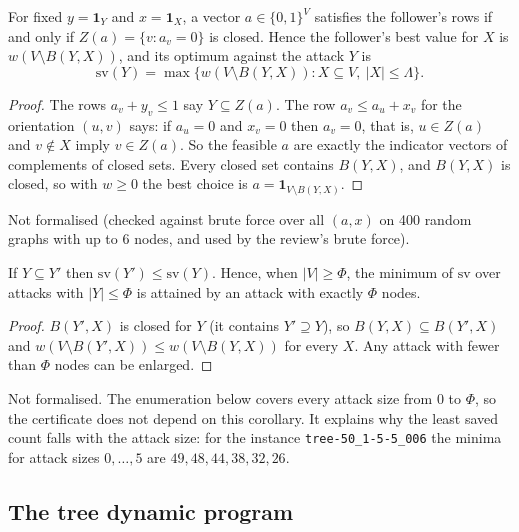 \begin{lemma}[Closure]\label{lem:fire-closure}
For fixed $y=\mathbf{1}_Y$ and $x=\mathbf{1}_X$, a vector $a\in\{0,1\}^V$ satisfies the
follower's rows if and only if $Z(a)=\{v: a_v=0\}$ is closed. Hence the
follower's best value for $X$ is $w(V\setminus B(Y,X))$, and its optimum against
the attack $Y$ is
\[
  \mathrm{sv}(Y)=\max\bigl\{w(V\setminus B(Y,X)) : X\subseteq V,\ |X|\le\Lambda\bigr\}.
\]
\end{lemma}
\begin{proof}
The rows $a_v+y_v\le 1$ say $Y\subseteq Z(a)$. The row $a_v\le a_u+x_v$ for the
orientation $(u,v)$ says: if $a_u=0$ and $x_v=0$ then $a_v=0$, that is, $u\in Z(a)$
and $v\notin X$ imply $v\in Z(a)$. So the feasible $a$ are exactly the indicator
vectors of complements of closed sets. Every closed set contains $B(Y,X)$,
and $B(Y,X)$ is closed, so with $w\ge 0$ the best choice is
$a=\mathbf{1}_{V\setminus B(Y,X)}$.
\end{proof}
\noindent Not formalised (checked against brute force over all $(a,x)$ on 400
random graphs with up to 6 nodes, and used by the review's brute force).

\begin{corollary}\label{cor:fire-monotone}
If $Y\subseteq Y'$ then $\mathrm{sv}(Y')\le\mathrm{sv}(Y)$. Hence, when $|V|\ge\Phi$,
the minimum of $\mathrm{sv}$ over attacks with $|Y|\le\Phi$ is attained by an attack
with exactly $\Phi$ nodes.
\end{corollary}
\begin{proof}
$B(Y',X)$ is closed for $Y$ (it contains $Y'\supseteq Y$), so
$B(Y,X)\subseteq B(Y',X)$ and $w(V\setminus B(Y',X))\le w(V\setminus B(Y,X))$ for every
$X$. Any attack with fewer than $\Phi$ nodes can be enlarged.
\end{proof}
\noindent Not formalised. The enumeration below covers every attack size
from $0$ to $\Phi$, so the certificate does not depend on this corollary.
It explains why the least saved count falls with the attack size: for
the instance \texttt{tree-50\_1-5-5\_006} the minima for attack sizes
$0,\dots,5$ are $49,48,44,38,32,26$.

\subsection{The tree dynamic program}

